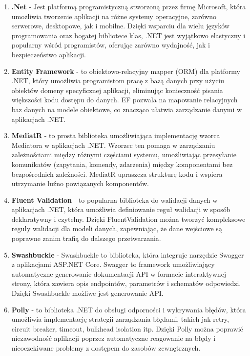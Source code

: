 \begin{enumerate}

\item {\bf .Net} - Jest platformą programistyczną stworzoną przez firmę Microsoft, która umożliwia tworzenie aplikacji na różne systemy operacyjne, zarówno serwerowe, desktopowe, jak i mobilne. Dzięki wsparciu dla wielu języków programowania oraz bogatej bibliotece klas, .NET jest wyjątkowo elastyczny i popularny wśród programistów, oferując zarówno wydajność, jak i bezpieczeństwo aplikacji.

\item {\bf Entity Framework} - to obiektowo-relacyjny mapper (ORM) dla platformy .NET, który umożliwia programistom pracę z bazą danych przy użyciu obiektów domeny specyficznej aplikacji, eliminując konieczność pisania większości kodu dostępu do danych. EF pozwala na mapowanie relacyjnych baz danych na modele obiektowe, co znacząco ułatwia zarządzanie danymi w aplikacjach .NET.

\item {\bf MediatR} - to prosta biblioteka umożliwiająca implementację wzorca Mediatora w aplikacjach .NET. Wzorzec ten pomaga w zarządzaniu zależnościami między różnymi częściami systemu, umożliwiając przesyłanie komunikatów (zapytania, komendy, zdarzenia) między komponentami bez bezpośrednich zależności. MediatR upraszcza strukturę kodu i wspiera utrzymanie luźno powiązanych komponentów.

\item {\bf Fluent Validation} - to popularna biblioteka do walidacji danych w aplikacjach .NET, która umożliwia definiowanie reguł walidacji w sposób deklaratywny i czytelny. Dzięki FluentValidation można tworzyć kompleksowe reguły walidacji dla modeli danych, zapewniając, że dane wejściowe są poprawne zanim trafią do dalszego przetwarzania.

\item {\bf Swashbuckle} - Swashbuckle to biblioteka, która integruje narzędzie Swagger z aplikacjami ASP.NET Core. Swagger to framework umożliwiający automatyczne generowanie dokumentacji API w formacie interaktywnej strony, która zawiera opis endpointów, parametrów i schematów odpowiedzi. Dzięki Swashbuckle możliwe jest generowanie API.

\item {\bf Polly} -  to biblioteka .NET do obsługi odporności i wykrywania błędów, która umożliwia implementację strategii zarządzania błędami, takich jak retry, circuit breaker, timeout, bulkhead isolation itp. Dzięki Polly można poprawić niezawodność aplikacji poprzez automatyczne reagowanie na błędy i nieoczekiwane problemy z dostępem do zasobów zewnętrznych.


\end{enumerate}

